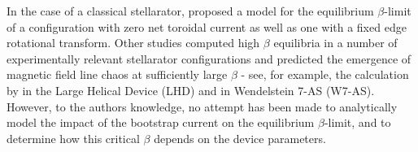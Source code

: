 \documentclass[my_thesis.tex]{subfiles}
\begin{document}
In the case of a classical stellarator, \citet{Loizu2017} proposed a model for the equilibrium $\beta$-limit of a configuration with zero net toroidal current as well as one with a fixed edge rotational transform. 
Other studies computed high $\beta$ equilibria in a number of experimentally relevant stellarator configurations and predicted the emergence of magnetic field line chaos at sufficiently large $\beta$ - see, for example, the calculation by \citet{suzukiTheoreticalStudiesEquilibrium2020} in the Large Helical Device (LHD) and \citet{Reiman2007} in Wendelstein 7-AS (W7-AS). However, to the authors knowledge, no attempt has been made to analytically model the impact of the bootstrap current on the equilibrium $\beta$-limit, and to determine how this critical $\beta$ depends on the device parameters.


\end{document}
